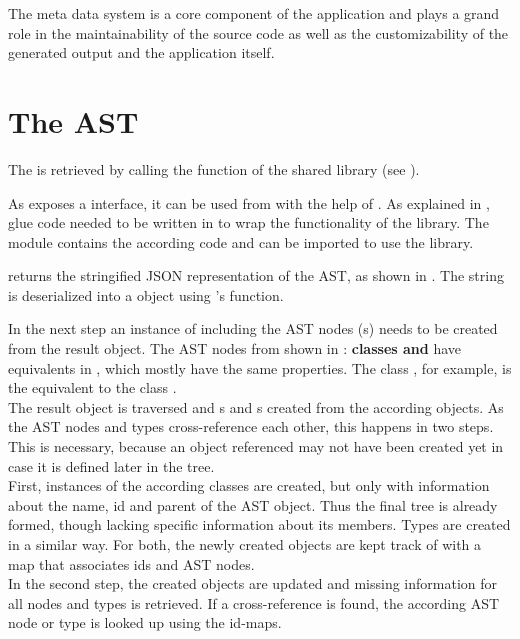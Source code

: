 The meta data system is a core component of the application and plays a grand role in the maintainability of the source code as well as the customizability of the generated output and the application itself.

\section{The  AST}
\label{sec:CPPAST}

The  is retrieved by calling the  function of the  shared library (see ).

As  exposes a  interface, it can be used from  with the help of . As explained in , glue code needed to be written in  to wrap the functionality of the library. The  module contains the according code and can be imported to use the  library.

 returns the stringified JSON representation of the  AST, as shown in . The string is deserialized into a  object using 's  function.

In the next step an instance of  including the AST nodes (s) needs to be created from the result object. The AST nodes from  shown in : \textbf{ classes and } have equivalents in , which mostly have the same properties. The  class , for example, is the equivalent to the  class .\\
The result object is traversed and s and s created from the according objects. As the AST nodes and types cross-reference each other, this happens in two steps. This is necessary, because an object referenced may not have been created yet in case it is defined later in the tree.\\
First, instances of the according classes are created, but only with information about the name, id and parent of the AST object. Thus the final tree is already formed, though lacking specific information about its members. Types are created in a similar way. For both, the newly created objects are kept track of with a map that associates ids and AST nodes.\\
In the second step, the created objects are updated and missing information for all nodes and types is retrieved. If a cross-reference is found, the according AST node or type is looked up using the id-maps.

